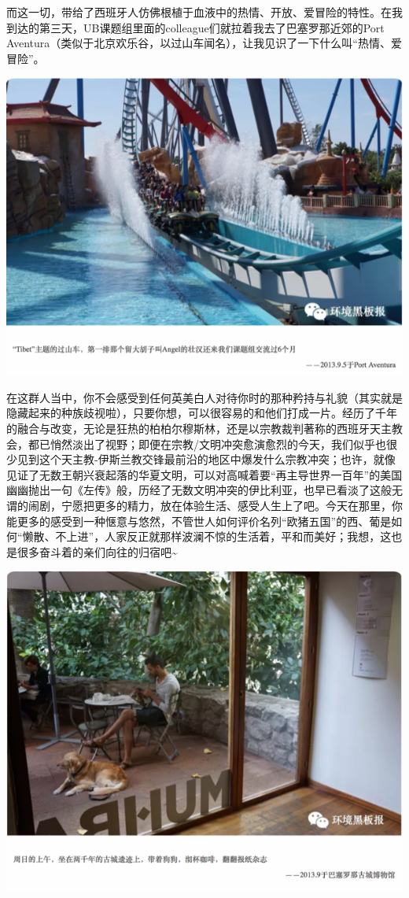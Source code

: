 \documentclass[]{book}
\begin{document}
而这一切，带给了西班牙人仿佛根植于血液中的热情、开放、爱冒险的特性。在我到达的第三天，UB课题组里面的colleague们就拉着我去了巴塞罗那近郊的Port
Aventura（类似于北京欢乐谷，以过山车闻名），让我见识了一下什么叫``热情、爱冒险''。

\includegraphics[width=8.33in]{images/xt8}

在这群人当中，你不会感受到任何英美白人对待你时的那种矜持与礼貌（其实就是隐藏起来的种族歧视啦），只要你想，可以很容易的和他们打成一片。经历了千年的融合与改变，无论是狂热的柏柏尔穆斯林，还是以宗教裁判著称的西班牙天主教会，都已悄然淡出了视野；即便在宗教/文明冲突愈演愈烈的今天，我们似乎也很少见到这个天主教-伊斯兰教交锋最前沿的地区中爆发什么宗教冲突；也许，就像见证了无数王朝兴衰起落的华夏文明，可以对高喊着要``再主导世界一百年''的美国幽幽抛出一句《左传》般，历经了无数文明冲突的伊比利亚，也早已看淡了这般无谓的闹剧，宁愿把更多的精力，放在体验生活、感受人生上了吧。今天在那里，你能更多的感受到一种惬意与悠然，不管世人如何评价名列``欧猪五国''的西、葡是如何``懒散、不上进''，人家反正就那样波澜不惊的生活着，平和而美好；我想，这也是很多奋斗着的亲们向往的归宿吧\textasciitilde{}

\includegraphics[width=8.33in]{images/xt9}
\end{document}
